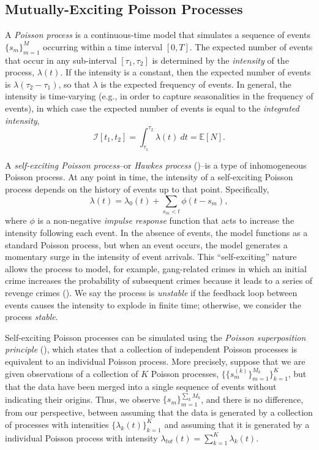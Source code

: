 	\subsection{Mutually-Exciting Poisson Processes}
		A \textit{Poisson process} is a continuous-time model that simulates a sequence of events $\{s_m\}_{m=1}^M$ occurring within a time interval $\left[0, T\right]$. The expected number of events that occur in any sub-interval $[\tau_1, \tau_2]$ is determined by the \textit{intensity} of the process, $\lambda(t)$. If the intensity is a constant, then the expected number of events is $\lambda (\tau_2 - \tau_1)$, so that $\lambda$ is the expected frequency of events. In general, the intensity is time-varying (e.g., in order to capture seasonalities in the frequency of events), in which case the expected number of events is equal to the \textit{integrated intensity},
		\begin{equation}
			\mathcal{I}\left[t_1, t_2\right] = \int_{\tau_1}^{\tau_2} \lambda(t) \ dt = \mathbb{E} \left[ N \right].
		\end{equation}

		A \textit{self-exciting Poisson process}--or \textit{Hawkes process} (\cite{Hawkes1971})--is a type of inhomogeneous Poisson process. At any point in time, the intensity of a self-exciting Poisson process depends on the history of events up to that point. Specifically,
		\begin{equation}
			\lambda(t) = \lambda_0(t) + \sum_{s_m < t} \phi(t - s_m),
		\end{equation}
		where $\phi$ is a non-negative \textit{impulse response} function that acts to increase the intensity following each event. In the absence of events, the model functions as a standard Poisson process, but when an event occurs, the model generates a momentary surge in the intensity of event arrivals. This ``self-exciting'' nature allows the process to model, for example, gang-related crimes in which an initial crime increases the probability of subsequent crimes because it leads to a series of revenge crimes (\cite{Cho2013}). We say the process is \textit{unstable} if the feedback loop between events causes the intensity to explode in finite time; otherwise, we consider the process \textit{stable}.

		Self-exciting Poisson processes can be simulated using the \textit{Poisson superposition principle} (\cite{Kingman1993}), which states that a collection of independent Poisson processes is equivalent to an individual Poisson process. More precisely, suppose that we are given observations of a collection of $K$ Poisson processes, $\{ \{ s_m^{(k)} \}_{m=1}^{M_k} \}_{k=1}^K$, but that the data have been merged into a single sequence of events without indicating their origins. Thus, we observe $\{ s_m \}_{m=1}^{\sum_k M_k}$, and there is no difference, from our perspective, between assuming that the data is generated by a collection of processes with intensities $\{\lambda_k(t)\}_{k=1}^K$ and assuming that it is generated by a individual Poisson process with intensity $\lambda_{tot}(t) = \sum_{k=1}^K \lambda_k(t)$.

